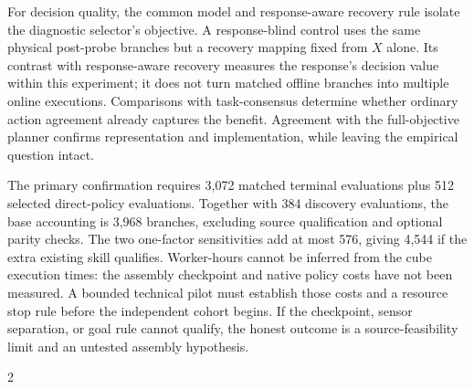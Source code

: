 \documentclass[conference]{IEEEtran}
\begin{document}
For decision quality, the common model and response-aware recovery rule isolate the diagnostic selector's objective. A response-blind control uses the same physical post-probe branches but a recovery mapping fixed from $X$ alone. Its contrast with response-aware recovery measures the response's decision value within this experiment; it does not turn matched offline branches into multiple online executions. Comparisons with task-consensus determine whether ordinary action agreement already captures the benefit. Agreement with the full-objective planner confirms representation and implementation, while leaving the empirical question intact.

The primary confirmation requires 3,072 matched terminal evaluations plus 512 selected direct-policy evaluations. Together with 384 discovery evaluations, the base accounting is 3,968 branches, excluding source qualification and optional parity checks. The two one-factor sensitivities add at most 576, giving 4,544 if the extra existing skill qualifies. Worker-hours cannot be inferred from the cube execution times: the assembly checkpoint and native policy costs have not been measured. A bounded technical pilot must establish those costs and a resource stop rule before the independent cohort begins. If the checkpoint, sensor separation, or goal rule cannot qualify, the honest outcome is a source-feasibility limit and an untested assembly hypothesis.

\clearpage
\onecolumn
\begin{multicols}{2}


\end{multicols}
\end{document}
